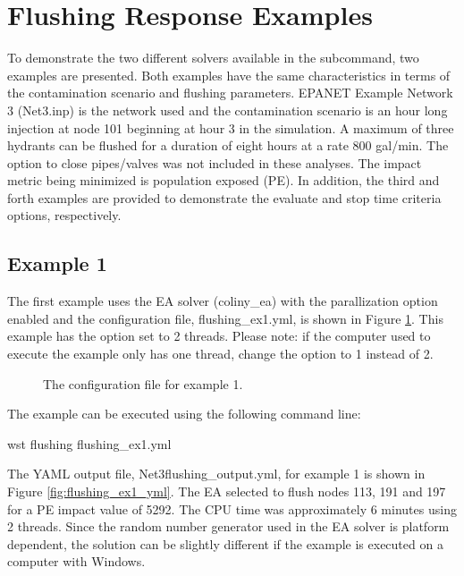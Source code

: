\section{Flushing Response Examples}\label{flushing_example}
To demonstrate the two different solvers available in the  subcommand, 
two examples are presented. Both examples have the same characteristics in terms 
of the contamination scenario and flushing parameters. EPANET Example Network 3 (Net3.inp)
is the network used and the contamination scenario is an hour long injection at 
node 101 beginning at hour 3 in the simulation. A maximum of three hydrants can be flushed 
for a duration of eight hours at a rate 800 gal/min. The option to close pipes/valves was 
not included in these analyses. The impact metric being minimized is population exposed (PE). 
In addition, the third and forth examples are provided to demonstrate the evaluate and stop time
criteria options, respectively.

\subsection{Example 1}

The first example uses the EA solver (coliny\_ea) with the parallization option enabled 
and the configuration file, flushing\_ex1.yml, is shown in Figure \ref{fig:flushing_ex1}. This example
has the \code{[solver][threads]} option set to 2 threads. Please note: 
if the computer used to execute the example only has one thread, change the \code{[solver][threads]} 
option to 1 instead of 2.

\begin{figure}[h]
  \caption{The  configuration file for example 1.}
  \label{fig:flushing_ex1}
\end{figure}

The example can be executed using the following command line:

\begin{unknownListing}
wst flushing flushing_ex1.yml
\end{unknownListing}

The YAML output file, Net3flushing\_output.yml, for example 1 
is shown in Figure \ref{fig:flushing_ex1_yml}. The EA selected to 
flush nodes 113, 191 and 197 for a PE impact value of 5292. The CPU time 
was approximately 6 minutes using 2 threads. 
Since the random number generator used in the EA solver is platform dependent,   
the solution can be slightly different if the example is executed on a computer with Windows.

